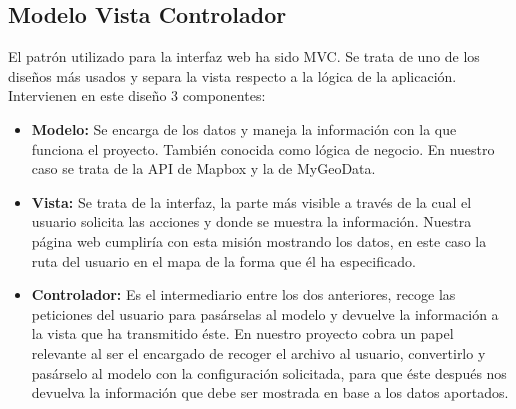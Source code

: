 \subsection{Modelo Vista Controlador}
El patrón utilizado para la interfaz web ha sido MVC\cite{mvc}. Se trata de uno de los diseños más usados y separa la vista respecto a la lógica de la aplicación. Intervienen en este diseño 3 componentes:
\begin{itemize}
\tightlist
\item
    \textbf{Modelo:} Se encarga de los datos y maneja la información con la que funciona el proyecto. También conocida como lógica de negocio. En nuestro caso se trata de la API de Mapbox y la de MyGeoData.
\item
    \textbf{Vista:} Se trata de la interfaz, la parte más visible a través de la cual el usuario solicita las acciones y donde se muestra la información. Nuestra página web cumpliría con esta misión mostrando los datos, en este caso la ruta del usuario en el mapa de la forma que él ha especificado.
\item
    \textbf{Controlador:} Es el intermediario entre los dos anteriores, recoge las peticiones del usuario para pasárselas al modelo y devuelve la información a la vista que ha transmitido éste. En nuestro proyecto cobra un papel relevante al ser el encargado de recoger el archivo al usuario, convertirlo y pasárselo al modelo con la configuración solicitada, para que éste después nos devuelva la información que debe ser mostrada en base a los datos aportados.
\end{itemize}







